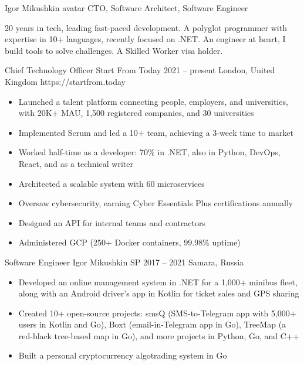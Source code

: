 \documentclass[9pt,a4paper]{juicv}
\begin{document}
\begin{paracol}{2}
\cvMakeHeader
    {Igor Mikushkin}
    {avatar}
    {CTO, Software Architect, Software Engineer}

    20 years in tech, leading fast-paced development.
    A polyglot programmer with expertise in 10+ languages, recently focused on .NET.
    An engineer at heart, I build tools to solve challenges.
    A Skilled Worker visa holder.

    \cvLeftEvent
        {Chief Technology Officer}
        {Start From Today}
        {2021 -- present}
        {London, United Kingdom}
        {https://startfrom.today}

        \begin{itemize}
            \item Launched a talent platform connecting people, employers, and universities,
                  with 20K+ MAU, 1,500 registered companies, and 30 universities
            \item Implemented Scrum and led a 10+ team,
                  achieving a 3-week time to market
            \item Worked half-time as a developer: 70\% in .NET,
                  also in Python, DevOps, React, and as a technical writer
            \item Architected a scalable system with 60 microservices
            \item Oversaw cybersecurity, earning Cyber Essentials Plus certifications annually
            \item Designed an API for internal teams and contractors
            \item Administered GCP (250+ Docker containers, 99.98\% uptime)
        \end{itemize}

    \cvLeftEvent
        {Software Engineer}
        {Igor Mikushkin SP}
        {2017 -- 2021}
        {Samara, Russia}
        {}

        \begin{itemize}
            \item Developed an online management system in .NET for a 1,000+ minibus fleet,
                  along with an Android driver’s app in Kotlin for ticket sales and GPS sharing
            \item Created 10+ open-source projects:
                  smsQ (SMS-to-Telegram app with 5,000+ users in Kotlin and Go),
                  Boxt (email-in-Telegram app in Go),
                  TreeMap (a red-black tree-based map in Go),
                  and more projects in Python, Go, and C++
            \item Built a personal cryptocurrency algotrading system in Go
        \end{itemize}


\end{paracol}
\end{document}
